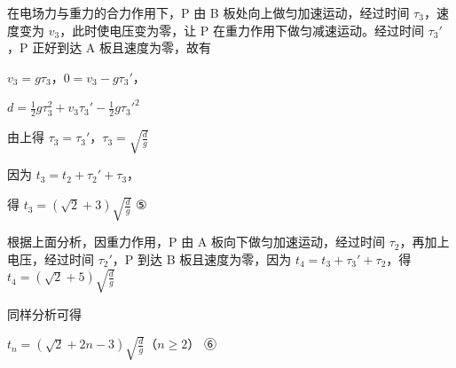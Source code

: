 \documentclass[\gkver]{gaokaozhenti}
\begin{document}
\begin{enumerate}
{在电场力与重力的合力作用下，P 由 B 板处向上做匀加速运动，经过时间 $\tau_{3}$，速度变为 $v_{3}$，此时使电压变为零，让 P 在重力作用下做匀减速运动。经过时间 $\tau_{3}'$，P 正好到达 A 板且速度为零，故有

$v_{3}=g\tau_{3}$，$0=v_{3}-g\tau_{3}'$，

$d=\frac{1}{2}g\tau_{3}^{2}+v_{3}\tau_{3}'-\frac{1}{2}g\tau_{3}'^{2}$

由上得 $\tau_{3}=\tau_{3}'$，$\tau_{3}=\sqrt{\frac{d}{g}}$

因为 $t_{3}=t_{2}+\tau_{2}'+\tau_{3}$，

得 $t_{3}=(\sqrt{2}+3)\sqrt{\frac{d}{g}}$ ⑤

根据上面分析，因重力作用，P 由 A 板向下做匀加速运动，经过时间 $\tau_{2}$，再加上电压，经过时间 $\tau_{2}'$，P 到达 B 板且速度为零，因为 $t_{4}=t_{3}+\tau_{3}'+\tau_{2}$，得 $t_{4}=(\sqrt{2}+5)\sqrt{\frac{d}{g}}$

同样分析可得

$t_{n}=(\sqrt{2}+2n-3)\sqrt{\frac{d}{g}}$（$n\geqslant2$） ⑥
}

\end{enumerate}
\end{document}
